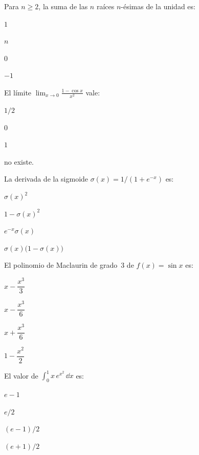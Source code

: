 \begin{cuestiones}
\item {} Para $n\ge2$, la suma de las $n$ raíces $n$-ésimas de la unidad es:
\begin{opciones}
  \item $1$
  \item $n$
  \item $0$
  \item $-1$
\end{opciones}

\item {} El límite $\displaystyle\lim_{x\to0}\frac{1-\cos x}{x^{2}}$ vale:
\begin{opciones}
  \item $1/2$
  \item $0$
  \item $1$
  \item no existe.
\end{opciones}

\item {} La derivada de la sigmoide $\sigma(x)=1/(1+e^{-x})$ es:
\begin{opciones}
  \item $\sigma(x)^{2}$
  \item $1-\sigma(x)^{2}$
  \item $e^{-x}\sigma(x)$
  \item $\sigma(x)\bigl(1-\sigma(x)\bigr)$
\end{opciones}

\item {} El polinomio de Maclaurin de grado~3 de $f(x)=\sin x$ es:
\begin{opciones}
  \item $x-\dfrac{x^{3}}{3}$
  \item $x-\dfrac{x^{3}}{6}$
  \item $x+\dfrac{x^{3}}{6}$
  \item $1-\dfrac{x^{2}}{2}$
\end{opciones}

\item {} El valor de $\displaystyle\int_{0}^{1}x\,e^{x^{2}}\,\dd x$ es:
\begin{opciones}
  \item $e-1$
  \item $e/2$
  \item $(e-1)/2$
  \item $(e+1)/2$
\end{opciones}


\end{cuestiones}
